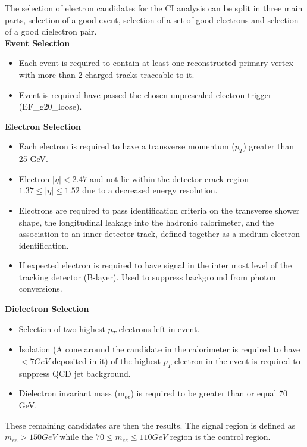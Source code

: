 	The selection of electron candidates for the CI analysis can be split in three main parts, selection of a good event, selection of a set of good electrons and selection of a good dielectron pair.\\

	{\bf Event Selection}
	\begin{itemize}
	\item Each event is required to contain at least one reconstructed primary vertex with more than 2 charged tracks traceable to it.
	\item Event is required have passed the chosen unprescaled electron trigger (EF\_g20\_loose).
	\end{itemize}

	{\bf Electron Selection}
	\begin{itemize}
	\item Each electron is required to have a transverse momentum ($p_{T}$) greater than 25 GeV.
	\item Electron $|\eta| < 2.47$ and not lie within the detector crack region $1.37 \leq |\eta| \leq 1.52$ due to a decreased energy resolution.
	\item Electrons are required to pass identification criteria on the transverse shower shape, the longitudinal leakage into the hadronic calorimeter, and the association to an inner detector track, defined together as a medium electron identification.
	\item If expected electron is required to have signal in the inter most level of the tracking detector (B-layer). Used to suppress background from photon conversions.
	\end{itemize}

	{\bf Dielectron Selection}
	\begin{itemize}
	\item Selection of two highest $p_{T}$ electrons left in event.
	\item Isolation (A cone around the candidate in the calorimeter is required to have $< 7 GeV$ deposited in it) of the highest $p_{T}$ electron in the event is required to suppress QCD jet background. 
	\item Dielectron invariant mass (m$_{ee}$) is required to be greater than or equal 70 GeV.
	\end{itemize}

	These remaining candidates are then the results. The signal region is defined as $m_{ee} > 150 GeV$ while the $70 \leq m_{ee} \leq 110 GeV$ region is the control region.

